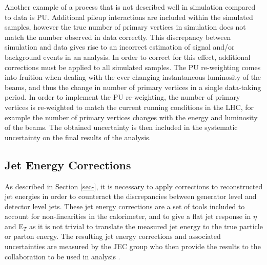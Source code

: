 Another example of a process that is not described well in simulation compared to data is PU. Additional pileup interactions are included within the simulated samples, however the true number of primary vertices in simulation does not match the number observed in data correctly. This discrepancy between simulation and data gives rise to an incorrect estimation of signal and/or background events in an analysis. In order to correct for this effect, additional corrections must be applied to all simulated samples. The PU re-weighting comes into fruition when dealing with the ever changing instantaneous luminosity of the beams, and thus the change in number of primary vertices in a single data-taking period. In order to implement the PU re-weighting, the number of primary vertices is re-weighted to match the current running conditions in the LHC, for example the number of primary vertices changes with the energy and luminosity of the beams. The obtained uncertainty is then included in the systematic uncertainty on the final results of the analysis. 





\subsection{Jet Energy Corrections} \label{subsec-JECUncertainty}

As described in Section \ref{sec-}, it is necessary to apply corrections to reconstructed jet energies in order to counteract the discrepancies between generator level and detector level jets. These jet energy corrections are a set of tools included to account for non-linearities in the calorimeter, and to give a flat jet response in $\eta$ and E$_T$ as it is not trivial to translate the measured jet energy to the true particle or parton energy. The resulting jet energy corrections and associated uncertainties are measured by the JEC group who then provide the results to the collaboration to be used in analysis \cite{1748-0221-6-11-P11002, CMS-DP-2013-033}.

